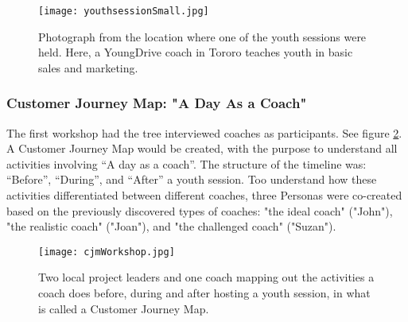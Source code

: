 \begin{figure}[h]
    \centering
    \texttt{[image: youthsessionSmall.jpg]}
    \caption{Photograph from the location where one of the youth sessions were held. Here, a YoungDrive coach in Tororo teaches youth in basic sales and marketing.}
    \label{fig:youthsession}
\end{figure}

\subsubsection{Customer Journey Map: "A Day As a Coach"}
The first workshop had the tree interviewed coaches as participants. See figure \ref{fig:cjm}. A Customer Journey Map would be created, with the purpose to understand all activities involving “A day as a coach”. The structure of the timeline was: “Before”, “During”, and “After” a youth session. Too understand how these activities differentiated between different coaches, three Personas were co-created based on the previously discovered types of coaches: "the ideal coach" ("John"), "the realistic coach" ("Joan"), and "the challenged coach" ("Suzan").

    \begin{figure}[h]
        \centering
        \texttt{[image: cjmWorkshop.jpg]}
        \caption{Two local project leaders and one coach mapping out the activities a coach does before, during and after hosting a youth session, in what is called a Customer Journey Map.}
        \label{fig:cjm}
    \end{figure}
